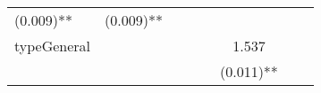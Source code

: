 \documentclass[12pt,twoside]{reedthesis}
\begin{document}
\begin{longtable}[]{@{}lccccccc@{}}
\begin{minipage}[t]{0.10\columnwidth}
  (0.009)**\strut
  \end{minipage} & \begin{minipage}[t]{0.10\columnwidth}\centering\strut
  (0.009)**\strut
  \end{minipage}\tabularnewline
  \begin{minipage}[t]{0.11\columnwidth}\raggedright\strut
  typeGeneral\strut
  \end{minipage} & \begin{minipage}[t]{0.08\columnwidth}\centering\strut
  \strut
  \end{minipage} & \begin{minipage}[t]{0.10\columnwidth}\centering\strut
  \strut
  \end{minipage} & \begin{minipage}[t]{0.10\columnwidth}\centering\strut
  \strut
  \end{minipage} & \begin{minipage}[t]{0.10\columnwidth}\centering\strut
  \strut
  \end{minipage} & \begin{minipage}[t]{0.10\columnwidth}\centering\strut
  1.537\strut
  \end{minipage} & \begin{minipage}[t]{0.10\columnwidth}\centering\strut
  \strut
  \end{minipage} & \begin{minipage}[t]{0.10\columnwidth}\centering\strut
  \strut
  \end{minipage}\tabularnewline
  \begin{minipage}[t]{0.11\columnwidth}\raggedright\strut
  \strut
  \end{minipage} & \begin{minipage}[t]{0.08\columnwidth}\centering\strut
  \strut
  \end{minipage} & \begin{minipage}[t]{0.10\columnwidth}\centering\strut
  \strut
  \end{minipage} & \begin{minipage}[t]{0.10\columnwidth}\centering\strut
  \strut
  \end{minipage} & \begin{minipage}[t]{0.10\columnwidth}\centering\strut
  \strut
  \end{minipage} & \begin{minipage}[t]{0.10\columnwidth}\centering\strut
  (0.011)**\strut
  \end{minipage} & \begin{minipage}[t]{0.10\columnwidth}\centering\strut

\end{minipage}
\end{longtable}
\end{document}
